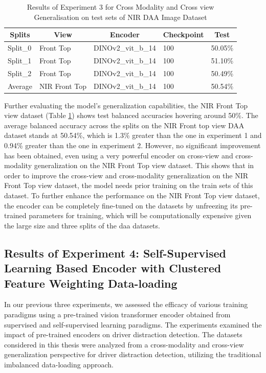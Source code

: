 \begin{table}[htbp]
\caption{Results of Experiment 3 for Cross Modality and Cross view Generalisation on test sets of NIR DAA Image Dataset}
\label{table:experiment 3 results Cross Modality and view Generalisation on NIR}
\centering
\begin{tabular}{lllll}
\multicolumn{1}{c}{\textbf{Splits}} & \multicolumn{1}{c}{\textbf{View}} & \multicolumn{1}{c}{\textbf{Encoder}} & \multicolumn{1}{c}{\textbf{Checkpoint}} & \multicolumn{1}{c}{\textbf{Test}}\\
\hline
Split\_0 & Front Top & DINOv2\_vit\_b\_14 & 100 & 50.05\% \\
Split\_1 & Front Top & DINOv2\_vit\_b\_14 & 100 & 51.10\% \\
Split\_2 & Front Top & DINOv2\_vit\_b\_14 & 100 & 50.49\% \\
\hline
Average & NIR Front Top & DINOv2\_vit\_b\_14 & 100 & 50.54\% \\
\hline
\end{tabular}
\end{table}

Further evaluating the model's generalization capabilities, the NIR Front Top view dataset (Table \ref{table:experiment 3 results Cross Modality and view Generalisation on NIR}) shows test balanced accuracies hovering around 50\%. The average balanced accuracy across the splits on the NIR Front top view DAA dataset stands at 50.54\%, which is 1.3\% greater than the one in experiment 1 and 0.94\% greater than the one in experiment 2. However, no significant improvement has been obtained, even using a very powerful encoder on cross-view and cross-modality generalization on the NIR Front Top view dataset. This shows that in order to improve the cross-view and cross-modality generalization on the NIR Front Top view dataset, the model needs prior training on the train sets of this dataset. To further enhance the performance on the NIR Front Top view dataset, the encoder can be completely fine-tuned on the datasets by unfreezing its pre-trained parameters for training, which will be computationally expensive given the large size and three splits of the \gls{daa} datasets.

\subsection{Results of Experiment 4: Self-Supervised Learning Based Encoder with Clustered Feature Weighting Data-loading}
In our previous three experiments, we assessed the efficacy of various training paradigms using a pre-trained vision transformer encoder obtained from supervised and self-supervised learning paradigms. The experiments examined the impact of pre-trained encoders on driver distraction detection. The datasets considered in this thesis were analyzed from a cross-modality and cross-view generalization perspective for driver distraction detection, utilizing the traditional imbalanced data-loading approach.

